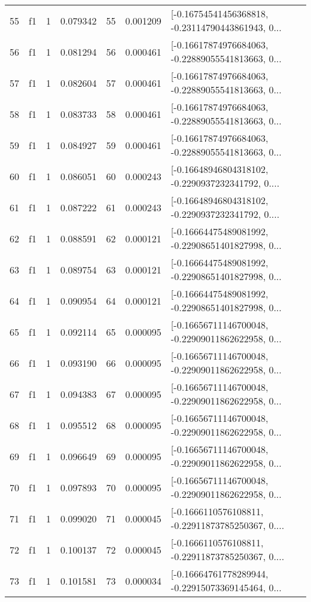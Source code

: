 \begin{tabular}{lllrlrl}
55  &  f1 &   1 &  0.079342 &   55 &  0.001209 &  [-0.16754541456368818, -0.23114790443861943, 0... \\
56  &  f1 &   1 &  0.081294 &   56 &  0.000461 &  [-0.16617874976684063, -0.22889055541813663, 0... \\
57  &  f1 &   1 &  0.082604 &   57 &  0.000461 &  [-0.16617874976684063, -0.22889055541813663, 0... \\
58  &  f1 &   1 &  0.083733 &   58 &  0.000461 &  [-0.16617874976684063, -0.22889055541813663, 0... \\
59  &  f1 &   1 &  0.084927 &   59 &  0.000461 &  [-0.16617874976684063, -0.22889055541813663, 0... \\
60  &  f1 &   1 &  0.086051 &   60 &  0.000243 &  [-0.16648946804318102, -0.2290937232341792, 0.... \\
61  &  f1 &   1 &  0.087222 &   61 &  0.000243 &  [-0.16648946804318102, -0.2290937232341792, 0.... \\
62  &  f1 &   1 &  0.088591 &   62 &  0.000121 &  [-0.16664475489081992, -0.22908651401827998, 0... \\
63  &  f1 &   1 &  0.089754 &   63 &  0.000121 &  [-0.16664475489081992, -0.22908651401827998, 0... \\
64  &  f1 &   1 &  0.090954 &   64 &  0.000121 &  [-0.16664475489081992, -0.22908651401827998, 0... \\
65  &  f1 &   1 &  0.092114 &   65 &  0.000095 &  [-0.16656711146700048, -0.22909011862622958, 0... \\
66  &  f1 &   1 &  0.093190 &   66 &  0.000095 &  [-0.16656711146700048, -0.22909011862622958, 0... \\
67  &  f1 &   1 &  0.094383 &   67 &  0.000095 &  [-0.16656711146700048, -0.22909011862622958, 0... \\
68  &  f1 &   1 &  0.095512 &   68 &  0.000095 &  [-0.16656711146700048, -0.22909011862622958, 0... \\
69  &  f1 &   1 &  0.096649 &   69 &  0.000095 &  [-0.16656711146700048, -0.22909011862622958, 0... \\
70  &  f1 &   1 &  0.097893 &   70 &  0.000095 &  [-0.16656711146700048, -0.22909011862622958, 0... \\
71  &  f1 &   1 &  0.099020 &   71 &  0.000045 &  [-0.1666110576108811, -0.22911873785250367, 0.... \\
72  &  f1 &   1 &  0.100137 &   72 &  0.000045 &  [-0.1666110576108811, -0.22911873785250367, 0.... \\
73  &  f1 &   1 &  0.101581 &   73 &  0.000034 &  [-0.16664761778289944, -0.22915073369145464, 0... \\

\end{tabular}
